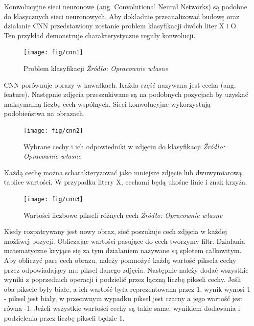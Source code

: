 \documentclass[brudnopis]{xmgr}
\begin{document}
Konwolucyjne sieci neuronowe (ang. Convolutional Neural Networks)\cite{14} są podobne do klasycznych sieci neuronowych. Aby dokładnie przeanalizować budowę oraz działanie CNN przedstawiony zostanie problem klasyfikacji dwóch liter X i O. Ten przykład demonstruje charakterystyczne reguły konwolucji.

\begin{figure}[!tbh]
\centering
\texttt{[image: fig/cnn1]}
\caption{Problem klasyfikacji \emph{Źródło: Opracownie własne}}
\end{figure}

CNN porównuje obrazy w kawałkach. Każda część nazywana jest cecha (ang. feature). Następnie zdjęcia przeszukiwane są na podobnych pozycjach by uzyskać maksymalną liczbę cech wspólnych. Sieci konwolucyjne wykorzystują podobieństwa na obrazach.

\begin{figure}[!tbh]
\centering
\texttt{[image: fig/cnn2]}
\caption{Wybrane cechy i ich odpowiedniki w zdjęciu do klasyfikacji \emph{Źródło: Opracownie własne}}
\end{figure}
\newpage

Każdą cechę można scharakteryzować jako mniejsze zdjęcie lub dwuwymiarową tablice wartości. W przypadku litery X, cechami będą ukośne linie i znak krzyża.

\begin{figure}[!tbh]
\centering
\texttt{[image: fig/cnn3]}
\caption{Wartości liczbowe pikseli różnych cech \emph{Źródło: Opracownie własne}}
\end{figure}

Kiedy rozpatrywany jest nowy obraz, sieć poszukuje cech zdjęcia w każdej możliwej pozycji. Obliczając wartości pasujące do cech tworzymy filtr. Działania matematyczne kryjące się za tym działaniem nazywane są splotem całkowitym. Aby obliczyć parę cech obrazu, należy pomnożyć każdą wartość piksela cechy przez odpowiadający mu piksel danego zdjęcia. Następnie należy dodać wszystkie wyniki z poprzednich operacji i podzielić przez łączną liczbę pikseli cechy. Jeśli oba piksele były białe, a ich wartość była reprezentowana przez 1, wynik wynosi 1 - piksel jest biały, w przeciwnym wypadku piksel jest czarny a jego wartość jest równa -1. Jeżeli wszystkie wartości cechy są takie same, wynikiem dodawania i podzielenia przez liczbę pikseli będzie 1.
\newpage
\end{document}
